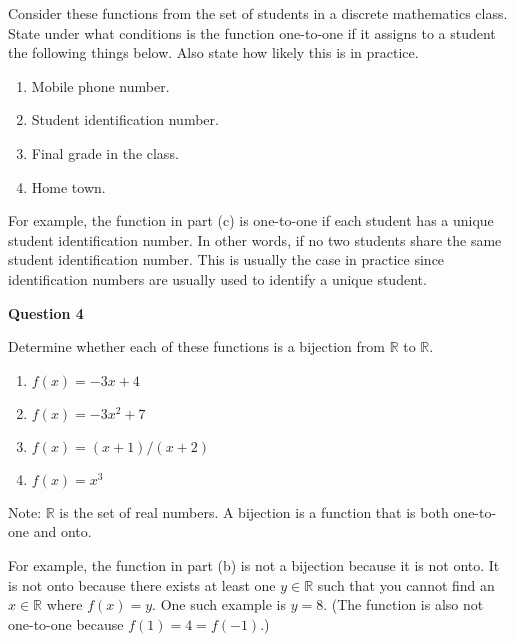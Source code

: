 \documentclass[11pt]{article}
\begin{document}
\begin{enumerate}
Consider these functions from the set of students in a discrete mathematics class. State under what conditions is the function one-to-one if it assigns to a student the following things below. Also state how likely this is in practice.

\begin{enumerate}[label=(\alph*)]
\item Mobile phone number.
\item Student identification number.
\item Final grade in the class.
\item Home town.
\end{enumerate}

For example, the function in part (c) is one-to-one if each student has a unique student identification number. In other words, if no two students share the same student identification number. This is usually the case in practice since identification numbers are usually used to identify a unique student.

\textbf{Question 4}

Determine whether each of these functions is a bijection from $\mathbb{R}$ to  $\mathbb{R}$.

\begin{enumerate}[label=(\alph*)]
\item $f(x) = - 3 x + 4$
\item $f(x) = -3 x^2 + 7$
\item $f(x) = (x+1) / (x+2)$
\item $f(x) = x^3$
\end{enumerate}

Note: $\mathbb{R}$ is the set of real numbers. A bijection is a function that is both one-to-one and onto.

For example, the function in part (b) is not a bijection because it is not onto. It is not onto because there exists at least one $y \in \mathbb{R}$ such that you cannot find an $x \in \mathbb{R}$ where $f(x) = y$. One such example is $y=8$. (The function is also not one-to-one because $f(1) = 4 = f(-1)$.)


\end{enumerate}
\end{document}
